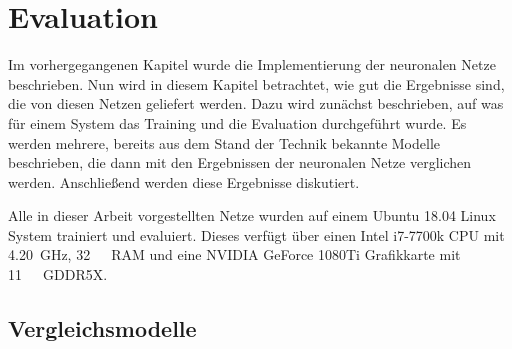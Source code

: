 \chapter{Evaluation}
\label{cap:Eval}

Im vorhergegangenen Kapitel wurde die Implementierung der neuronalen Netze beschrieben.
Nun wird in diesem Kapitel betrachtet, wie gut die Ergebnisse sind, die von diesen Netzen geliefert werden.
Dazu wird zunächst beschrieben, auf was für einem System das Training und die Evaluation durchgeführt wurde.
Es werden mehrere, bereits aus dem Stand der Technik bekannte Modelle beschrieben, die dann mit den Ergebnissen der neuronalen Netze 
verglichen werden.
Anschließend werden diese Ergebnisse diskutiert.


Alle in dieser Arbeit vorgestellten Netze wurden auf einem Ubuntu 18.04 Linux System trainiert und evaluiert.
Dieses verfügt über einen Intel i7-7700k CPU mit \SI{4.20}{\giga\hertz}, \SI{32}{\giga\byte}~RAM und eine NVIDIA GeForce 1080Ti Grafikkarte mit \SI{11}{\giga\byte}~GDDR5X. 


\section{Vergleichsmodelle}



